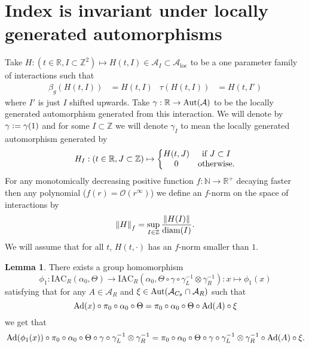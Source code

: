 \documentclass[12pt,a4paper,twoside]{article}
\newcommand{\defeq}{\vcentcolon=}
\let\originalleft\left
\let\originalright\right
\renewcommand{\left}{\mathopen{}\mathclose\bgroup\originalleft}
\renewcommand{\right}{\aftergroup\egroup\originalright}
\newcommand{\ZZ}{\mathbb Z}
\renewcommand{\AA}{\mathcal A}
\newcommand{\RR}{\mathbb R}
\newcommand{\NN}{\mathbb{N}}
\newcommand{\Ad}[1]{\textrm{Ad}\left(#1\right)}
\newcommand{\Aut}[1]{\textrm{Aut}\left(#1\right)}
\theoremstyle{definition}
\newtheorem{lemma}[theorem]{Lemma}
\numberwithin{equation}{section}
\begin{document}
\section{Index is invariant under locally generated automorphisms}\label{sec:IndexInvariantUnderLGA}
Take $H:(t\in\RR, I\subset \ZZ^2)\mapsto H(t,I)\in\AA_I\subset\AA_{\text{loc}}$ to be a one parameter family of interactions such that
\begin{align}
\beta_g(H(t,I))&=H(t,I)&\tau(H(t,I))&=H(t,I')
\end{align}
where $I'$ is just $I$ shifted upwards. Take $\gamma:\RR\rightarrow\Aut{\AA}$ to be the locally generated automorphism generated from this interaction. We will denote by $\gamma\defeq \gamma(1)$ and for some $I\subset \ZZ$ we will denote $\gamma_I$ to mean the locally generated automorphism generated by 
\begin{equation}
	H_I:(t\in\RR,J\subset\ZZ)\mapsto\left\{\begin{matrix}H(t,J)&\text{if }J\subset I\\0&\text{otherwise.}\end{matrix}\right.
\end{equation}
For any monotomically decreasing positive function $f:\NN\rightarrow\RR^+$ decaying faster then any polynomial ($f(r)=\mathcal{O}(r^\infty)$) we define an $f$-norm on the space of interactions by
\begin{equation}
	\norm{H}_f=\sup_{I\in\ZZ}\frac{\norm{H(I)}}{\textrm{diam}(I)}.
\end{equation}
We will assume that for all $t$, $H(t,\cdot)$ has an $f$-norm smaller than $1$.
\begin{lemma}\label{lem:DefinitionOfGroupMorphism}
	There exists a group homomorphism
	\begin{equation}
		\phi_1:\textrm{IAC}_R(\alpha_0,\Theta) \rightarrow \textrm{IAC}_R(\alpha_0,\Theta\circ \gamma \circ \gamma_L^{-1}\otimes\gamma_R^{-1}):x\mapsto \phi_1(x)
	\end{equation}
	satisfying that for any $A\in\AA_R$ and $\xi\in\Aut{\AA_{C_\theta}\cap\AA_R}$ such that
	\begin{equation}
		\Ad{x}\circ\pi_0\circ\alpha_0\circ\Theta=\pi_0\circ\alpha_0\circ\Theta\circ\Ad{A}\circ\xi
	\end{equation}
	we get that
	\begin{equation}\label{eq:ConditionDefinitionOfGroupMorphism}
		\Ad{\phi_1(x)}\circ\pi_0\circ\alpha_0\circ\Theta\circ\gamma\circ\gamma_L^{-1}\otimes\gamma_R^{-1}=\pi_0\circ\alpha_0\circ\Theta\circ\gamma\circ\gamma_L^{-1}\otimes\gamma_R^{-1}\circ\Ad{A}\circ\xi.
	\end{equation}
\end{lemma}
\end{document}
